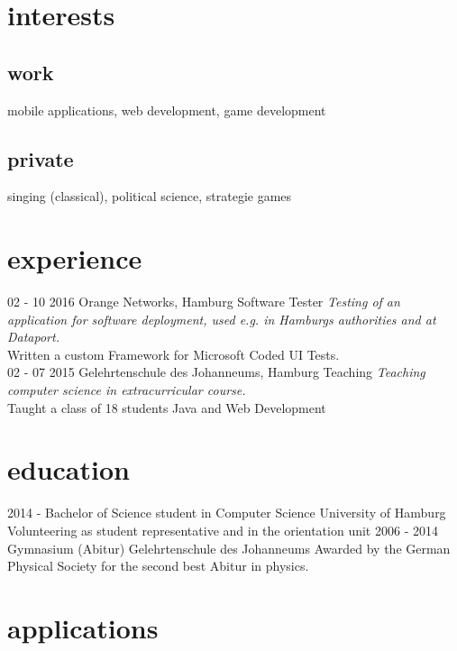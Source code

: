 \documentclass[]{friggeri-cv}
\begin{document}
\section{interests}
  \subsection{work}
    mobile applications, web development, game development
  \subsection{private}
    singing (classical), political science, strategie games


\section{experience}

\begin{entrylist}
  \entry
    {02 - 10 2016}
    {Orange Networks, Hamburg}
    {Software Tester}
    {\emph{Testing of an application for software deployment, used e.g. in Hamburgs authorities and at Dataport.}\\
    Written a custom Framework for Microsoft Coded UI Tests.} \\
  \entry
    {02 - 07 2015}
    {Gelehrtenschule des Johanneums, Hamburg}
    {Teaching}
    {\emph{Teaching computer science in extracurricular course.}\\
    Taught a class of 18 students Java and Web Development}
\end{entrylist}

\section{education}

\begin{entrylist}
  \entry
    {2014 - }
    {Bachelor of Science student {\normalfont in Computer Science}}
    {University of Hamburg}
    {Volunteering as student representative and in the orientation unit}
  \entry
    {2006 - 2014}
    {Gymnasium (Abitur)}
    {Gelehrtenschule des Johanneums}
    {Awarded by the German Physical Society for the second best Abitur in physics.}
\end{entrylist}

\section{applications}
\end{document}
